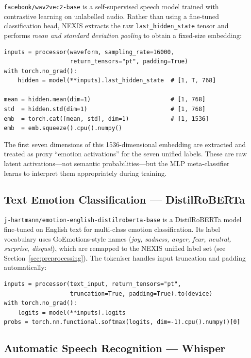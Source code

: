 \documentclass[12pt,a4paper]{article}
\begin{document}
\texttt{facebook/wav2vec2-base} is a self-supervised speech model trained
with contrastive learning on unlabelled audio. Rather than using a
fine-tuned classification head, NEXIS extracts the raw
\texttt{last\_hidden\_state} tensor and performs \textit{mean and standard
deviation pooling} to obtain a fixed-size embedding:

\begin{lstlisting}[caption={Wav2Vec2 pooling to produce a latent audio vector.}]
inputs = processor(waveform, sampling_rate=16000,
                   return_tensors="pt", padding=True)
with torch.no_grad():
    hidden = model(**inputs).last_hidden_state  # [1, T, 768]

mean = hidden.mean(dim=1)                       # [1, 768]
std  = hidden.std(dim=1)                        # [1, 768]
emb  = torch.cat([mean, std], dim=1)            # [1, 1536]
emb  = emb.squeeze().cpu().numpy()
\end{lstlisting}

The first seven dimensions of this 1536-dimensional embedding are extracted
and treated as proxy ``emotion activations'' for the seven unified labels.
These are raw latent activations—not semantic probabilities—but the MLP
meta-classifier learns to interpret them appropriately during training.

\subsection{Text Emotion Classification — DistilRoBERTa}

\texttt{j-hartmann/emotion-english-distilroberta-base} is a DistilRoBERTa
model fine-tuned on English text for multi-class emotion classification. Its
label vocabulary uses GoEmotions-style names (\textit{joy, sadness, anger,
fear, neutral, surprise, disgust}), which are remapped to the NEXIS unified
label set (see Section~\ref{sec:preprocessing}). The tokeniser handles
input truncation and padding automatically:

\begin{lstlisting}[caption={DistilRoBERTa text classification.}]
inputs = processor(text_input, return_tensors="pt",
                   truncation=True, padding=True).to(device)
with torch.no_grad():
    logits = model(**inputs).logits
probs = torch.nn.functional.softmax(logits, dim=-1).cpu().numpy()[0]
\end{lstlisting}

\subsection{Automatic Speech Recognition — Whisper}
\end{document}
